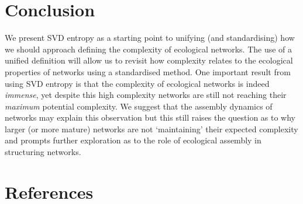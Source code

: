 \documentclass[10pt,oneside]{article}
\begin{document}
\hypertarget{conclusion}{%
\section{Conclusion}\label{conclusion}}

We present SVD entropy as a starting point to unifying (and
standardising) how we should approach defining the complexity of
ecological networks. The use of a unified definition will allow us to
revisit how complexity relates to the ecological properties of networks
using a standardised method. One important result from using SVD entropy
is that the complexity of ecological networks is indeed \emph{immense},
yet despite this high complexity networks are still not reaching their
\emph{maximum} potential complexity. We suggest that the assembly
dynamics of networks may explain this observation but this still raises
the question as to why larger (or more mature) networks are not
`maintaining' their expected complexity and prompts further exploration
as to the role of ecological assembly in structuring networks.

\hypertarget{references}{%
\section*{References}\label{references}}
\end{document}
